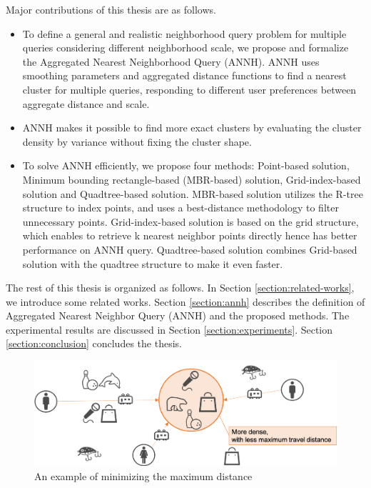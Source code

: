 \documentclass[a4paper,11pt]{report}
\theoremstyle{mytheoremstyle}
\begin{document}
Major contributions of this thesis are as follows.
\begin{itemize}
    \item  To define a general and realistic neighborhood query problem for multiple queries considering different neighborhood scale, we propose and formalize the Aggregated Nearest Neighborhood Query (ANNH). ANNH uses smoothing parameters and aggregated distance functions to find a nearest cluster for multiple queries, responding to different user preferences between aggregate distance and scale.
  \item ANNH makes it possible to find more exact clusters by evaluating the cluster density by variance without fixing the cluster shape.
  \item To solve ANNH efficiently, we propose four methods: Point-based solution, Minimum bounding rectangle-based (MBR-based) solution, Grid-index-based solution and Quadtree-based solution. MBR-based solution utilizes the R-tree\cite{R-tree} structure to index points, and uses a best-distance methodology to filter unnecessary points. Grid-index-based solution is based on the grid structure\cite{BNNH}, which enables to retrieve k nearest neighbor points directly hence has better performance on ANNH query. Quadtree-based solution combines Grid-based solution with the quadtree structure\cite{finkel1974quad} to make it even faster.
\end{itemize}

The rest of this thesis is organized as follows. In Section \ref{section:related-works}, we introduce some related works. Section \ref{section:annh} describes the definition of Aggregated Nearest Neighbor Query (ANNH) and the proposed methods. The experimental results are discussed in Section \ref{section:experiments}. Section \ref{section:conclusion} concludes the thesis.

\begin{figure}
\includegraphics[width=\textwidth]{images/example-max.png}
\caption{An example of minimizing the maximum distance} \label{fig:example-max}
\end{figure}
\end{document}
